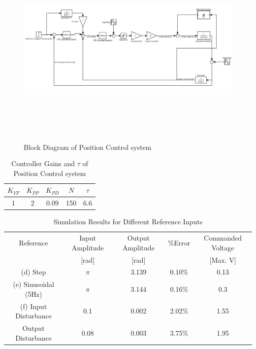 \documentclass{article}
\theoremstyle{plain}
\theoremstyle{definition}
\theoremstyle{remark}
\begin{document}
\begin{figure}[htb]
\begin{center}
\includegraphics[height = 10cm, width = 16 cm]{q3_17}
\caption{Block Diagram of Position Control system}
\label{q3_17}
\end{center}
\end{figure}

\begin{table}[htb]
\begin{center}
    \begin{tabular}{|c|c|c|c|c|}
        \hline
        $K_{VF}$ & $K_{PP}$ & $K_{PD}$ & $N$ & $\tau$ \\ \hline
        1        & 2        & 0.09     & 150 & 6.6    \\
        \hline
    \end{tabular}
\caption{Controller Gains and $\tau$ of Position Control system}
\end{center}
\end{table}


\begin{table}
\begin{center}
    \begin{tabular}{|c|c|c|c|c|}
        \hline
        Reference               & Input Amplitude  & Output Amplitude  & \%Error & Commanded Voltage  \\ 
        ~                       & [rad]          & [rad]           & ~       & [Max. V]           \\ \hline
        (d) Step                & $\pi$              & 3.139             & 0.10\%  & 0.13               \\ 
        (e) Sinusoidal (5Hz)          & $\pi$              & 3.144             & 0.16\%  & 0.3                \\ 
        (f) Input Disturbance   & 0.1              & 0.002             & 2.02\%  & 1.55               \\ 
             Output Disturbance & 0.08             & 0.003             & 3.75\%  & 1.95               \\
        \hline
    \end{tabular}
\caption{Simulation Results for Different Reference Inputs}
\end{center}
\end{table}
\end{document}
